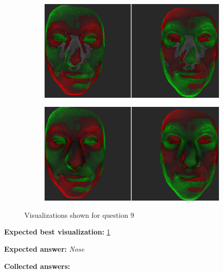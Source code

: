 \begin{figure}[h]
\begin{subfigure}{0.49\textwidth}
\includegraphics[width=\textwidth]{./img-study/pair23.PNG}
\caption{}
\label{fig:study-8-23}
\end{subfigure}
\begin{subfigure}{0.49\textwidth}
\includegraphics[width=\textwidth]{./img-study/pair20.PNG}
\caption{}
\label{fig:study-8-20}
\end{subfigure}
\caption{Visualizations shown for question 9}
\end{figure}
\medskip

{\bf Expected best visualization:} \ref{fig:study-8-23}
\medskip

{\bf Expected answer:} {\it Nose}
\medskip

{\bf Collected answers:}

